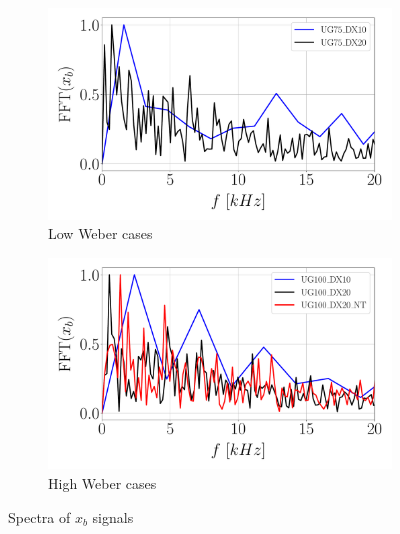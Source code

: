 \begin{figure}[ht]
\flushleft
\begin{subfigure}[b]{0.45\textwidth}
	\centering
   \includegraphics[scale=0.25]{./part2_developments/figures_ch5_resolved_JICF/results_dense_core_modeling/FFTs_UG75}
   \vspace*{-0.25in}
   \caption{Low Weber cases}
   \label{fig:JICF_DC_FFT_UG75} 
\end{subfigure}
\hspace{0.2in}
\begin{subfigure}[b]{0.45\textwidth}
	\centering
   \includegraphics[scale=0.25]{./part2_developments/figures_ch5_resolved_JICF/results_dense_core_modeling/FFTs_UG100}
   \vspace*{-0.25in}
   \caption{High Weber cases}
   \label{fig:JICF_DC_FFT_UG100}
\end{subfigure}
   \caption{Spectra of $x_b$ signals}
\label{fig:JICF_DC_FFTs_xb}
\end{figure}


